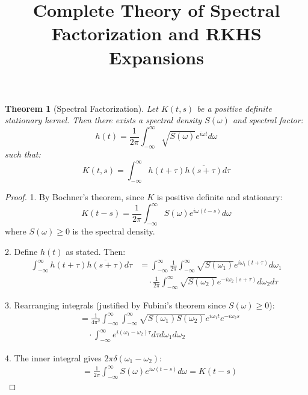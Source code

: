 \documentclass{article}
\newtheorem{theorem}{Theorem}
\begin{document}
\title{Complete Theory of Spectral Factorization and RKHS Expansions}
\author{}
\maketitle

\begin{theorem}[Spectral Factorization]
Let $K(t,s)$ be a positive definite stationary kernel. Then there exists a spectral density $S(\omega)$ and spectral factor:
\begin{equation}
    h(t) = \frac{1}{2\pi} \int_{-\infty}^{\infty} \sqrt{S(\omega)} e^{i\omega t} d\omega
\end{equation}
such that:
\begin{equation}
    K(t,s) = \int_{-\infty}^{\infty} h(t+\tau)\overline{h(s+\tau)}d\tau
\end{equation}
\end{theorem}

\begin{proof}
1. By Bochner's theorem, since $K$ is positive definite and stationary:
\begin{equation}
    K(t-s) = \frac{1}{2\pi} \int_{-\infty}^{\infty} S(\omega)e^{i\omega(t-s)}d\omega
\end{equation}
where $S(\omega) \geq 0$ is the spectral density.

2. Define $h(t)$ as stated. Then:
\begin{align*}
    \int_{-\infty}^{\infty} h(t+\tau)\overline{h(s+\tau)}d\tau &= \int_{-\infty}^{\infty} \frac{1}{2\pi} \int_{-\infty}^{\infty} \sqrt{S(\omega_1)} e^{i\omega_1(t+\tau)}d\omega_1 \\
    &\quad \cdot \frac{1}{2\pi} \int_{-\infty}^{\infty} \sqrt{S(\omega_2)} e^{-i\omega_2(s+\tau)}d\omega_2 d\tau
\end{align*}

3. Rearranging integrals (justified by Fubini's theorem since $S(\omega) \geq 0$):
\begin{align*}
    &= \frac{1}{4\pi^2} \int_{-\infty}^{\infty}\int_{-\infty}^{\infty} \sqrt{S(\omega_1)S(\omega_2)} e^{i\omega_1t}e^{-i\omega_2s} \\
    &\quad \cdot \int_{-\infty}^{\infty} e^{i(\omega_1-\omega_2)\tau}d\tau d\omega_1d\omega_2
\end{align*}

4. The inner integral gives $2\pi\delta(\omega_1-\omega_2)$:
\begin{align*}
    &= \frac{1}{2\pi} \int_{-\infty}^{\infty} S(\omega)e^{i\omega(t-s)}d\omega = K(t-s)
\end{align*}
\end{proof}
\end{document}
